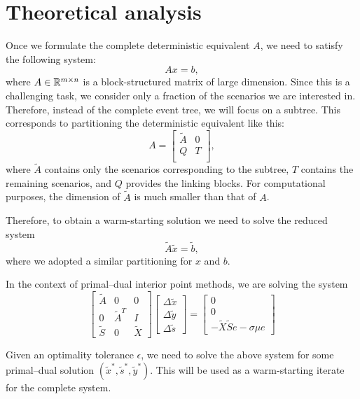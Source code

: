%
%


%
%
\section{Theoretical analysis}

Once we formulate the complete deterministic equivalent $A$, we need 
to satisfy the following system:
\[
Ax=b,
\]
where $A\in \mathbb{R}^{m\times n}$ is a block-structured matrix of 
large dimension. Since this is a challenging task, we consider 
only a fraction of the scenarios we are interested in. Therefore, 
instead of the complete event tree, we will focus on a subtree. 
This corresponds to partitioning the deterministic equivalent 
like this:
\[
A = \left[ \begin{array}{cc}
    \tilde{A} & 0 \\ Q & T \\
    \end{array} \right],
\]
where $\tilde{A}$ contains only the scenarios corresponding 
to the subtree, $T$ contains the remaining scenarios, and $Q$ 
provides the linking blocks. For computational purposes, the 
dimension of $\tilde{A}$ is much smaller than that of $A$.

Therefore, to obtain a warm-starting solution we need to solve 
the reduced system
\[
\tilde{A}\tilde{x}=\tilde{b},
\]
where we adopted a similar partitioning for $x$ and $b$.

In the context of primal--dual interior point methods, we are 
solving the system
\[
\left[ \begin{array}{ccc}
    \tilde{A} & 0 & 0 \\
    0 & \tilde{A}^T & I \\
    \tilde{S} & 0 & \tilde{X}
    \end{array} \right]
\left[ \begin{array}{c}
    \Delta\tilde{x} \\ \Delta\tilde{y} \\ \Delta\tilde{s}
\end{array} \right] = 
\left[ \begin{array}{c}
      0 \\ 0 \\ -\tilde{X}\tilde{S}e - \sigma\mu e
\end{array} \right]
\]

Given an optimality tolerance $\epsilon$, we need to solve 
the above system for some primal--dual solution 
$(\tilde{x}^*, \tilde{s}^*, \tilde{y}^*)$. This will be used 
as a warm-starting iterate for the complete system.

